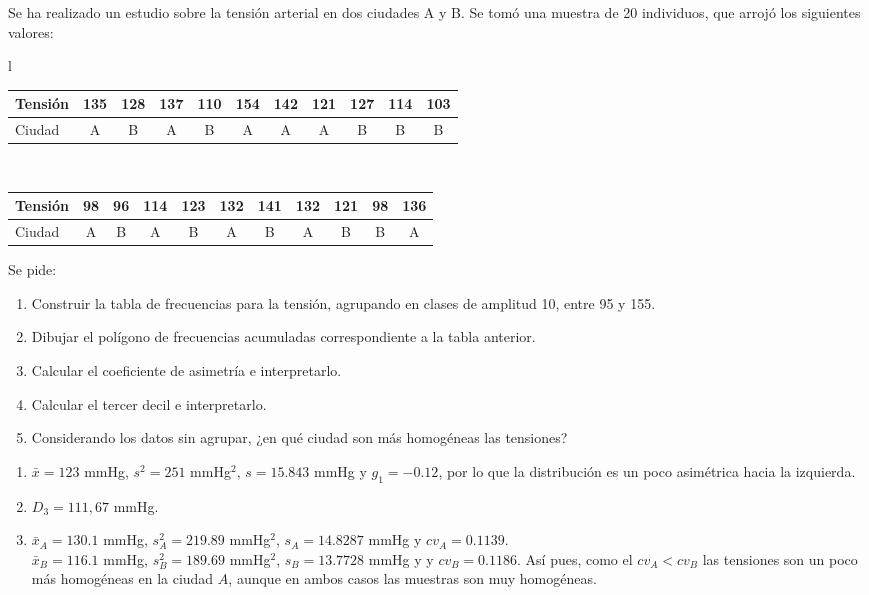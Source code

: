 {Se ha realizado un estudio sobre la tensión arterial en dos ciudades A y B. Se tomó una muestra de 20 individuos, que arrojó los siguientes valores:
\begin{center}
\begin{tabular}{l}
\begin{tabular}{|l|c|c|c|c|c|c|c|c|c|c|}
\hline
 Tensión & 135 & 128 & 137 & 110 & 154 & 142 & 121 & 127 & 114 & 103 \\
\hline
 Ciudad  &  A  &  B  &  A  &  B  &  A  &  A  &  A  &  B  &  B  &  B  \\
\hline
\end{tabular}
\\[.5cm]
\begin{tabular}{|l|c|c|c|c|c|c|c|c|c|c|}
\hline
 Tensión & 98 & 96 & 114 & 123 & 132 & 141 & 132 & 121 & 98 & 136 \\
\hline
 Ciudad  & A  & B  &  A  &  B  &  A  &  B  &  A  &  B  & B  &  A  \\
\hline
\end{tabular}
\end{tabular}
\end{center}
Se pide:
\begin{enumerate}
\item Construir la tabla de frecuencias para la tensión, agrupando en clases de amplitud 10, entre 95 y 155.
\item Dibujar el polígono de frecuencias acumuladas correspondiente a la tabla anterior.
\item Calcular el coeficiente de asimetría e interpretarlo.
\item Calcular el tercer decil e interpretarlo.
\item Considerando los datos sin agrupar, ¿en qué ciudad son más homogéneas las tensiones?
\end{enumerate}
}
{\begin{enumerate}[start=3]
\item $\bar x = 123$ mmHg, $s^2= 251$ mmHg$^2$, $s=15.843$ mmHg y $g_1=-0.12$, por lo que la distribución es un poco asimétrica hacia la izquierda.
\item $D_3= 111,67$ mmHg.
\item $\bar x_A=130.1$ mmHg, $s^2_A=219.89$ mmHg$^2$, $s_A=14.8287$ mmHg y $cv_A =0.1139$.\\
$\bar x_B=116.1$ mmHg, $s^2_B=189.69$ mmHg$^2$, $s_B=13.7728$ mmHg y y $cv_B = 0.1186$.
Así pues, como el $cv_A<cv_B$ las tensiones son un poco más homogéneas en la ciudad $A$, aunque en ambos casos las muestras son muy homogéneas.
\end{enumerate}
}
